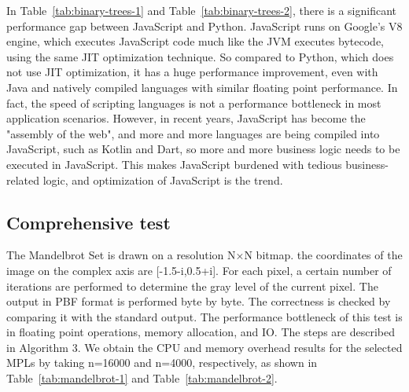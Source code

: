 In Table~\ref{tab:binary-trees-1} and Table~\ref{tab:binary-trees-2},
there is a significant performance gap between JavaScript and Python. JavaScript runs on Google's V8 engine, which executes JavaScript code much like the JVM executes bytecode, using the same JIT optimization technique. So compared to Python, which does not use JIT optimization, it has a huge performance improvement, even with Java and natively compiled languages with similar floating point performance. In fact, the speed of scripting languages is not a performance bottleneck in most application scenarios. However, in recent years, JavaScript has become the "assembly of the web", and more and more languages are being compiled into JavaScript, such as Kotlin and Dart, so more and more business logic needs to be executed in JavaScript. This makes JavaScript burdened with tedious business-related logic, and optimization of JavaScript is the trend.

\subsection{Comprehensive test}

The Mandelbrot Set is drawn on a resolution N×N bitmap. the coordinates of the image on the complex axis are [-1.5-i,0.5+i]. For each pixel, a certain number of iterations are performed to determine the gray level of the current pixel. The output in PBF format is performed byte by byte. The correctness is checked by comparing it with the standard output. The performance bottleneck of this test is in floating point operations, memory allocation, and IO.
The steps are described in Algorithm 3.
We obtain the CPU and memory overhead results
for the selected MPLs by taking n=16000 and n=4000, respectively,
as shown in Table~\ref{tab:mandelbrot-1} and Table~\ref{tab:mandelbrot-2}.

